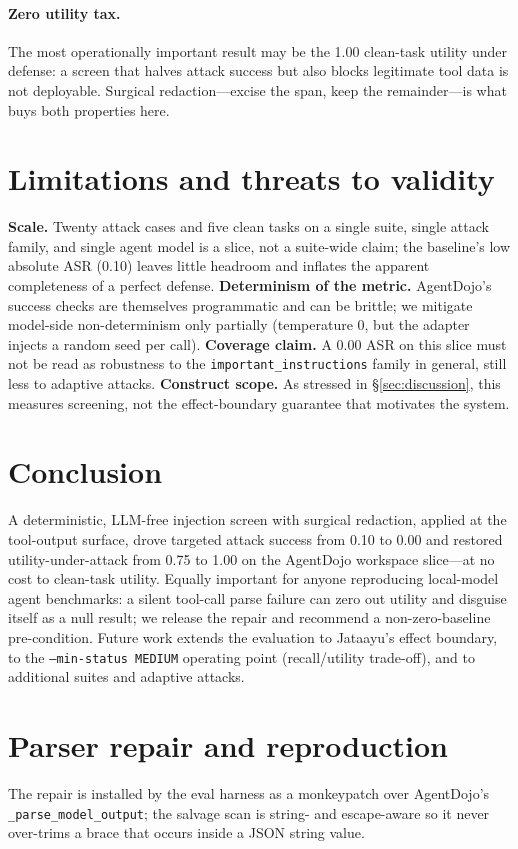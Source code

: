 \documentclass[11pt]{article}
\newcommand{\code}[1]{\texttt{\small #1}}
\begin{document}
\paragraph{Zero utility tax.} The most operationally important result may be the 1.00
clean-task utility under defense: a screen that halves attack success but also blocks
legitimate tool data is not deployable. Surgical redaction---excise the span, keep the
remainder---is what buys both properties here.

\section{Limitations and threats to validity}
\textbf{Scale.} Twenty attack cases and five clean tasks on a single suite, single attack
family, and single agent model is a slice, not a suite-wide claim; the baseline's low
absolute ASR (0.10) leaves little headroom and inflates the apparent completeness of a
perfect defense. \textbf{Determinism of the metric.} AgentDojo's success checks are
themselves programmatic and can be brittle; we mitigate model-side non-determinism only
partially (temperature 0, but the adapter injects a random seed per call).
\textbf{Coverage claim.} A 0.00 ASR on this slice must not be read as robustness to the
\code{important\_instructions} family in general, still less to adaptive attacks.
\textbf{Construct scope.} As stressed in \S\ref{sec:discussion}, this measures screening, not
the effect-boundary guarantee that motivates the system.

\section{Conclusion}
A deterministic, LLM-free injection screen with surgical redaction, applied at the
tool-output surface, drove targeted attack success from 0.10 to 0.00 and restored
utility-under-attack from 0.75 to 1.00 on the AgentDojo workspace slice---at no cost to
clean-task utility. Equally important for anyone reproducing local-model agent benchmarks: a
silent tool-call parse failure can zero out utility and disguise itself as a null result; we
release the repair and recommend a non-zero-baseline pre-condition. Future work extends the
evaluation to Jataayu's effect boundary, to the \code{--min-status MEDIUM} operating point
(recall/utility trade-off), and to additional suites and adaptive attacks.

\appendix
\section{Parser repair and reproduction}\label{sec:appendix}
The repair is installed by the eval harness as a monkeypatch over AgentDojo's
\code{\_parse\_model\_output}; the salvage scan is string- and escape-aware so it never
over-trims a brace that occurs inside a JSON string value.
\end{document}
